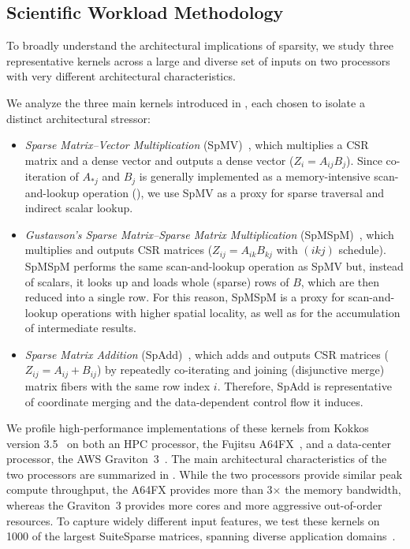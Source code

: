 \subsection{Scientific Workload Methodology} \label{sec:scientific-workload-methodology} %

To broadly understand the architectural implications of sparsity, we study three representative kernels across a large and diverse set of inputs on two processors with very different architectural characteristics.

We analyze the three main kernels introduced in , each chosen to isolate a distinct architectural stressor:
\begin{itemize}
    \item \emph{Sparse Matrix--Vector Multiplication} (SpMV)~\cite{williams2007sc}, which multiplies a CSR matrix and a dense vector and outputs a dense vector ($Z_i = A_{ij} B_j$). Since co-iteration of $A_{*j}$ and $B_j$ is generally implemented as a memory-intensive scan-and-lookup operation (), we use SpMV as a proxy for sparse traversal and indirect scalar lookup.
    \item \emph{Gustavson's Sparse Matrix--Sparse Matrix Multiplication} (SpMSpM)~\cite{gao2023systematic}, which multiplies and outputs CSR matrices ($Z_{ij} = A_{ik} B_{kj}$ with $(ikj)$ schedule). SpMSpM performs the same scan-and-lookup operation as SpMV but, instead of scalars, it looks up and loads whole (sparse) rows of $B$, which are then reduced into a single row. For this reason, SpMSpM is a proxy for scan-and-lookup operations with higher spatial locality, as well as for the accumulation of intermediate results.
    \item \emph{Sparse Matrix Addition} (SpAdd)~\cite{hussain2022ipdps}, which adds and outputs CSR matrices ($Z_{ij} = A_{ij} + B_{ij}$) by repeatedly co-iterating and joining (disjunctive merge) matrix fibers with the same row index $i$. Therefore, SpAdd is representative of coordinate merging and the data-dependent control flow it induces.
\end{itemize}

We profile high-performance implementations of these kernels from Kokkos version 3.5~\cite{edwards2014kokkos} on both an HPC processor, the Fujitsu A64FX~\cite{sato2020design}, and a data-center processor, the AWS Graviton~3~\cite{aws2026graviton,aws2022c7g}. The main architectural characteristics of the two processors are summarized in . While the two processors provide similar peak compute throughput, the A64FX provides more than 3$\times$ the memory bandwidth, whereas the Graviton~3 provides more cores and more aggressive out-of-order resources. To capture widely different input features, we test these kernels on 1000 of the largest SuiteSparse matrices, spanning diverse application domains~\cite{davis2011university}.

